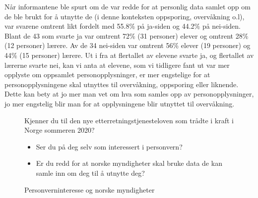 Når informantene ble spurt om de var redde for at personlig data samlet opp om de ble brukt for å utnytte de (i denne konteksten oppsporing, overvåkning o.l), var svarene omtrent likt fordelt med 55.8\% på ja-siden og 44.2\% på nei-siden. Blant de 43 som svarte ja var omtrent 72\% (31 personer) elever og omtrent 28\% (12 personer) lærere. Av de 34 nei-siden var omtrent 56\% elever (19 personer) og 44\% (15 personer) lærere. Ut i fra at flertallet av elevene svarte ja, og flertallet av lærerne svarte nei, kan vi anta at elevene, som vi tidligere fant ut var mer opplyste om oppsamlet personopplysninger, er mer engstelige for at personopplysningene skal utnyttes til overvåkning, oppsporing eller liknende. Dette kan bety at jo mer man vet om hva som samles opp av personopplysninger, jo mer engstelig blir man for at opplysningene blir utnyttet til overvåkning.

\begin{figure}[H]
    \centering
    \caption{Kjenner du til den nye etterretningstjenesteloven som trådte i kraft i Norge sommeren 2020?}
\end{figure}

\begin{figure}[H]
    \centering
    \begin{itemize}
        \item Ser du på deg selv som interessert i personvern?
        \item Er du redd for at norske myndigheter skal bruke data de kan samle inn om deg til å utnytte deg?
    \end{itemize}
    \caption{Personverninteresse og norske myndigheter}
\end{figure}



